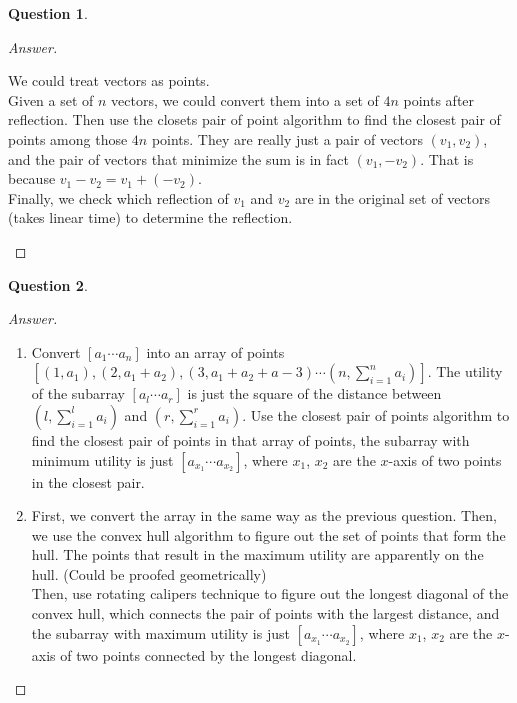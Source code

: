 \documentclass{article}
\theoremstyle{plain}
\newtheorem{question}{Question}
\newenvironment{answer}[1][Answer]
    {\begin{proof}[#1]{$ $}\renewcommand\qedsymbol{$\vartriangle$}}
    {\end{proof}}
\begin{document}
\begin{question}
\end{question}
\begin{answer}
    \begin{enumerate}
        We could treat vectors as points.\\

        Given a set of $n$ vectors, we could convert them into a set of $4n$ points after reflection. Then use the closets pair of point algorithm to find the closest pair of points among those $4n$ points. They are really just a pair of vectors $(v_1, v_2)$, and the pair of vectors that minimize the sum is in fact $(v_1, -v_2)$. That is because $v_1 - v_2 = v_1 + (-v_2)$. \\

        Finally, we check which reflection of $v_1$ and $v_2$ are in the original set of vectors (takes linear time) to determine the reflection.
    \end{enumerate}
\end{answer}

\begin{question}
\end{question}
\begin{answer}
    \begin{enumerate}
        \item
        Convert $[a_1 \cdots a_n]$ into an array of points $\displaystyle [(1, a_1), (2, a_1 + a_2), (3, a_1 + a_2 + a-3) \cdots (n, \sum_{i=1}^{n} a_i)]$. The utility of the subarray $[a_l \cdots a_r]$ is just the square of the distance between $\displaystyle(l, \sum_{i=1}^{l} a_i)$ and $\displaystyle(r, \sum_{i=1}^{r} a_i)$.
        Use the closest pair of points algorithm to find the closest pair of points in that array of points, the subarray with minimum utility is just $[a_{x_1} \cdots a_{x_2}]$, where $x_1$, $x_2$ are the $x$-axis of two points in the closest pair.
        \item
        First, we convert the array in the same way as the previous question. Then, we use the convex hull algorithm to figure out the set of points that form the hull. The points that result in the maximum utility are apparently on the hull. (Could be proofed geometrically)\\

        Then, use rotating calipers technique to figure out the longest diagonal of the convex hull, which connects the pair of points with the largest distance, and the subarray with maximum utility is just $[a_{x_1} \cdots a_{x_2}]$, where $x_1$, $x_2$ are the $x$-axis of two points connected by the longest diagonal.
    \end{enumerate}
\end{answer}
\end{document}
